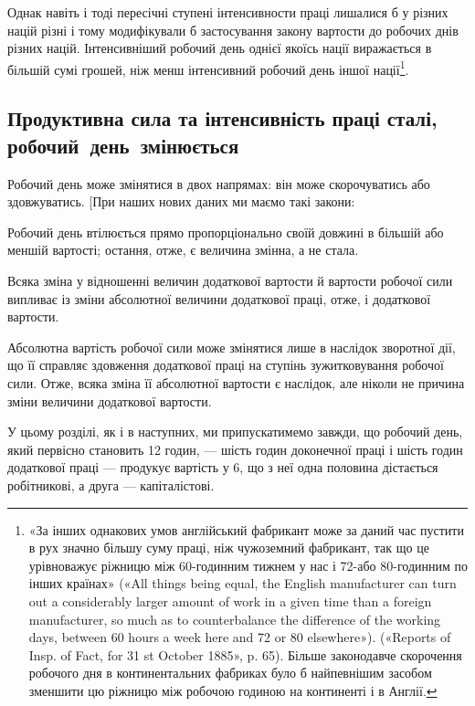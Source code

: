 \parcont{}  %
Однак навіть і тоді пересічні ступені інтенсивности праці лишалися
б у різних націй різні і тому модифікували б застосування
закону вартости до робочих днів різних націй. Інтенсивніший
робочий день однієї якоїсь нації виражається в більшій сумі
грошей, ніж менш інтенсивний робочий день іншої нації\footnote{
«За інших однакових умов англійський фабрикант може за даний
час пустити в рух значно більшу суму праці, ніж чужоземний фабрикант,
так що це урівноважує ріжницю між 60-годинним тижнем у нас
і 72-або 80-годинним по інших країнах» («All things being equal,
the English manufacturer can turn out a considerably larger amount of
work in a given time than a foreign manufacturer, so much as to counterbalance
the difference of the working days, between 60 hours a week here
and 72 or 80 elsewhere»). («Reports of Insp. of Fact, for 31 st October 1885»,
p. 65). Більше законодавче скорочення робочого дня в континентальних
фабриках було б найпевнішим засобом зменшити цю ріжницю між робочою
годиною на континенті і в Англії.
}.

\subsection{Продуктивна сила та інтенсивність праці сталі,
робочий~день~змінюється}

Робочий день може змінятися в двох напрямах: він може
скорочуватись або здовжуватись. [При наших нових даних ми
маємо такі закони:

Робочий день втілюється прямо пропорціонально своїй довжині
в більшій або меншій вартості; остання, отже, є величина
змінна, а не стала.

Всяка зміна у відношенні величин додаткової вартости й вартости
робочої сили випливає із зміни абсолютної величини додаткової
праці, отже, і додаткової вартости.

Абсолютна вартість робочої сили може змінятися лише в
наслідок зворотної дії, що її справляє здовження додаткової
праці на ступінь зужитковування робочої сили. Отже, всяка зміна
її абсолютної вартости є наслідок, але ніколи не причина зміни
величини додаткової вартости.

У цьому розділі, як і в наступних, ми припускатимемо завжди,
що робочий день, який первісно становить 12 годин, — шість
годин доконечної праці і шість годин додаткової праці — продукує
вартість у 6, що з неї одна половина дістається
робітникові, а друга — капіталістові.


